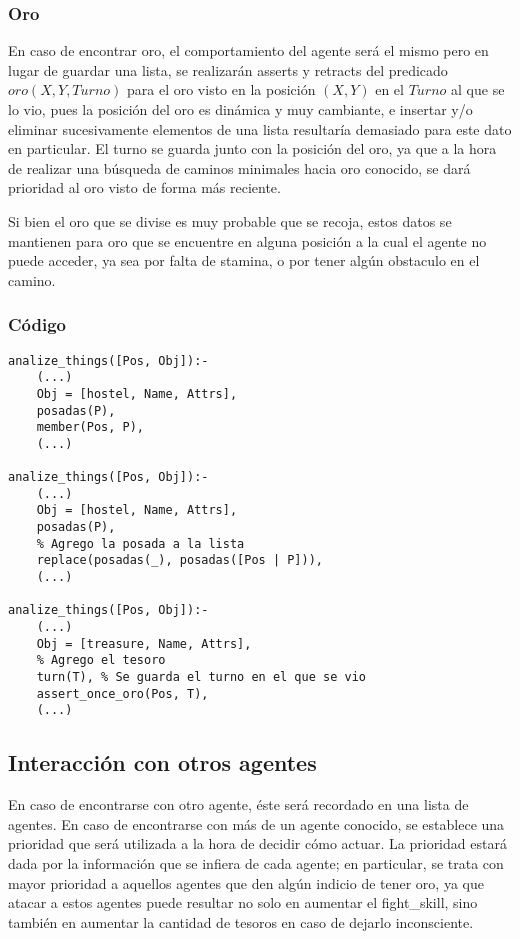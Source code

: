 \documentclass[a4paper,10pt,spanish]{article}
\begin{document}
		\subsubsection{Oro}
		
		En caso de encontrar oro, el comportamiento del agente ser\'a el mismo pero en lugar de guardar una lista, se realizar\'an asserts y retracts del predicado $oro(X, Y, Turno)$ para el oro visto en la posici\'on $(X, Y)$ en el $Turno$ al que se lo vio, pues la posici\'on del oro es din\'amica y muy cambiante, e insertar y/o eliminar sucesivamente elementos de una lista resultar\'ia demasiado para este dato en particular. El turno se guarda junto con la posici\'on del oro, ya que a la hora de realizar una b\'usqueda de caminos minimales hacia oro conocido, se dar\'a prioridad al oro visto de forma m\'as reciente.
		
		Si bien el oro que se divise es muy probable que se recoja, estos datos se mantienen para oro que se encuentre en alguna posici\'on a la cual el agente no puede acceder, ya sea por falta de stamina, o por tener alg\'un obstaculo en el camino.
		
		\subsubsection{C\'odigo}
		
		\begin{lstlisting}
analize_things([Pos, Obj]):- 
	(...)
	Obj = [hostel, Name, Attrs],
	posadas(P),
	member(Pos, P),
	(...)

analize_things([Pos, Obj]):- 
	(...)
	Obj = [hostel, Name, Attrs],
	posadas(P),
	% Agrego la posada a la lista
	replace(posadas(_), posadas([Pos | P])),
	(...)

analize_things([Pos, Obj]):- 
	(...)
	Obj = [treasure, Name, Attrs],
	% Agrego el tesoro
	turn(T), % Se guarda el turno en el que se vio
	assert_once_oro(Pos, T),
	(...)
		\end{lstlisting}
	
	\subsection{Interacci\'on con otros agentes}
	
	En caso de encontrarse con otro agente, \'este ser\'a recordado en una lista de agentes. En caso de encontrarse con m\'as de un agente conocido, se establece una prioridad que ser\'a utilizada a la hora de decidir c\'omo actuar. La prioridad estar\'a dada por la informaci\'on que se infiera de cada agente; en particular, se trata con mayor prioridad a aquellos agentes que den alg\'un indicio de tener oro, ya que atacar a estos agentes puede resultar no solo en aumentar el fight\_skill, sino tambi\'en en aumentar la cantidad de tesoros en caso de dejarlo inconsciente.
	
\end{document}
